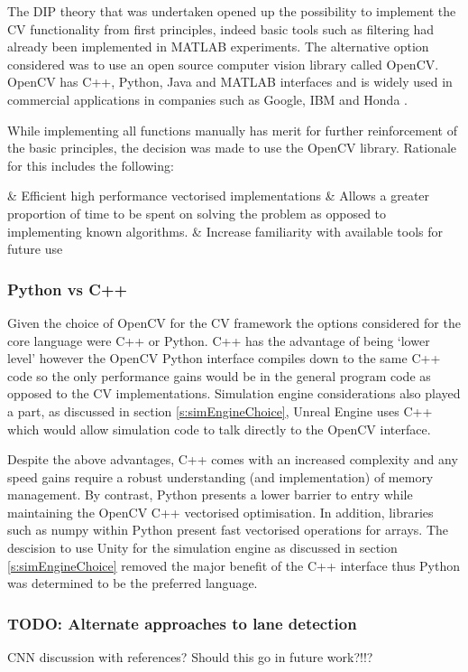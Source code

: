 \documentclass[]{aiaa-tc}%
\begin{document}
The DIP theory that was undertaken opened up the possibility to implement the CV functionality from first principles, indeed basic tools such as filtering had already been implemented in MATLAB experiments. The alternative option considered was to use an open source computer vision library called OpenCV. OpenCV has C++, Python, Java and MATLAB interfaces and is widely used in commercial applications in companies such as Google, IBM and Honda \citep{opencvWebsite}. 

While implementing all functions manually has merit for further reinforcement of the basic principles, the decision was made to use the OpenCV library. Rationale for this includes the following: 

\begin{easylist}
	& Efficient high performance vectorised implementations
	& Allows a greater proportion of time to be spent on solving the problem as opposed to implementing known algorithms.
	& Increase familiarity with available tools for future use
\end{easylist}

\subsubsection{Python vs C++} \label{s:pythonVc}

Given the choice of OpenCV for the CV framework the options considered for the core language were C++ or Python. C++ has the advantage of being `lower level' however the OpenCV Python interface compiles down to the same C++ code so the only performance gains would be in the general program code as opposed to the CV implementations. Simulation engine considerations also played a part, as discussed in section \ref{s:simEngineChoice}, Unreal Engine uses C++ which would allow simulation code to talk directly to the OpenCV interface.

Despite the above advantages, C++ comes with an increased complexity and any speed gains require a robust understanding (and implementation) of memory management. By contrast, Python presents a lower barrier to entry while maintaining the OpenCV C++ vectorised optimisation. In addition, libraries such as numpy within Python present fast vectorised operations for arrays. The descision to use Unity for the simulation engine as discussed in section \ref{s:simEngineChoice} removed the major benefit of the C++ interface thus Python was determined to be the preferred language.

\subsubsection{TODO: Alternate approaches to lane detection}
CNN discussion with references?
Should this go in future work?!!?
\end{document}
